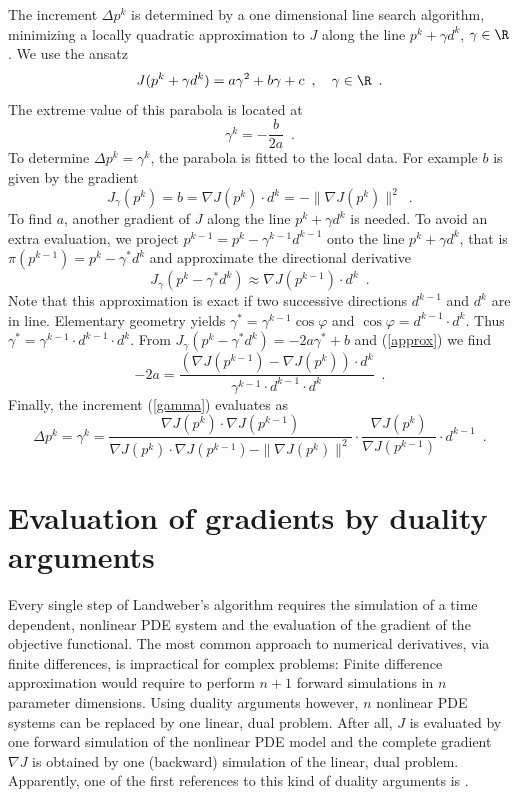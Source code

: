 The increment $\Delta p^k$ is determined by a one dimensional line search algorithm,
minimizing a locally quadratic approximation to $J$ along the line $p^k + \gamma d^k$, $\gamma \in \R$.
We use the ansatz 
$$
 J(p^k + \gamma d^k) = a \gamma^2 + b \gamma + c \enspace , \quad \gamma \in \R \enspace .
$$
The extreme value of this parabola is located at 
\begin{equation} \label{gamma}
 \gamma^k = - \frac{b}{2a} \enspace .
\end{equation}
To determine $\Delta p^k = \gamma^k$, the parabola is fitted to the local data.
For example $b$ is given by the gradient
$$
 J_\gamma(p^k) = b = \nabla J(p^k) \cdot d^k = - \| \nabla J(p^k) \|^2 \enspace .
$$
To find $a$, another gradient of $J$ along the line $p^k + \gamma d^k$ is needed.
To avoid an extra evaluation, we project $p^{k-1}=p^k - \gamma^{k-1} d^{k-1}$ onto the line 
$p^k + \gamma d^k$, that is $\pi(p^{k-1}) = p^k - \gamma^* d^k$ and approximate the directional derivative
\begin{equation} \label{approx}
 J_\gamma(p^k-\gamma^* d^k) \approx \nabla J(p^{k-1}) \cdot d^k \enspace .
\end{equation}
Note that this approximation is exact 
if two successive directions $d^{k-1}$ and $d^k$ are in line.
Elementary geometry yields
$\gamma^* = \gamma^{k-1} \cos \varphi$ and
$\cos \varphi = d^{k-1} \cdot d^k$. 
Thus $\gamma^* = \gamma^{k-1} \cdot d^{k-1} \cdot d^k$.
From $J_\gamma(p^k-\gamma^* d^k) = -2a\gamma^* +b$ and (\ref{approx}) we find
$$
 -2 a = 
 \frac{(\nabla J(p^{k-1}) - \nabla J(p^k))\cdot d^k}
      {\gamma^{k-1} \cdot d^{k-1} \cdot d^k} \enspace .
$$
Finally, the increment (\ref{gamma}) evaluates as
$$
 \Delta p^k = \gamma^k = 
 \frac{\nabla J(p^k)\cdot \nabla J(p^{k-1})}
      {\nabla J(p^k)\cdot \nabla J(p^{k-1}) - \|\nabla J(p^k)\|^2} \cdot
 \frac{\nabla J(p^k)}{\nabla J(p^{k-1})} \cdot
 d^{k-1} \enspace .
$$ 

\section{Evaluation of gradients by duality arguments}

Every single step of Landweber's algorithm requires the simulation of a time dependent, nonlinear PDE system
and the evaluation of the gradient of the objective functional.
The most common approach to numerical derivatives, via finite differences,
is impractical for complex problems:
Finite difference approximation would require to perform $n+1$ forward simulations in $n$ parameter dimensions.
Using duality arguments however, $n$ nonlinear PDE systems can be replaced by one linear, dual problem.
After all, $J$ is evaluated by one forward simulation of the nonlinear PDE model 
and the complete gradient $\nabla J$ is obtained by one (backward) simulation of the linear, dual problem.
Apparently, one of the first references to this kind of duality arguments is \cite{ChaLem74}.

